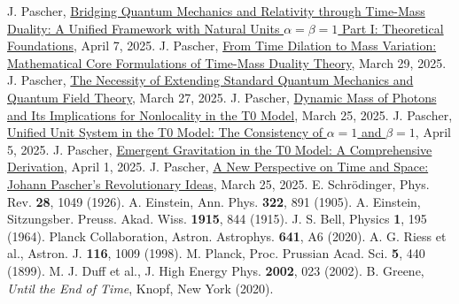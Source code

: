 \documentclass[12pt,a4paper]{article}
\begin{document}
	
	\begin{thebibliography}{99}
		 J. Pascher, \href{https://github.com/jpascher/T0-Time-Mass-Duality/tree/main/2/pdf/English/QMRelTimeMassPart1En.pdf}{Bridging Quantum Mechanics and Relativity through Time-Mass Duality: A Unified Framework with Natural Units \(\alpha = \beta = 1\) Part I: Theoretical Foundations}, April 7, 2025.
		 J. Pascher, \href{https://github.com/jpascher/T0-Time-Mass-Duality/tree/main/2/pdf/English/MathZeitMasseLagrange.pdf}{From Time Dilation to Mass Variation: Mathematical Core Formulations of Time-Mass Duality Theory}, March 29, 2025.
		 J. Pascher, \href{https://github.com/jpascher/T0-Time-Mass-Duality/tree/main/2/pdf/English/NotwendigkeitQMErweiterungEn.pdf}{The Necessity of Extending Standard Quantum Mechanics and Quantum Field Theory}, March 27, 2025.
		 J. Pascher, \href{https://github.com/jpascher/T0-Time-Mass-Duality/tree/main/2/pdf/English/DynMassePhotonenNichtlokalEn.pdf}{Dynamic Mass of Photons and Its Implications for Nonlocality in the T0 Model}, March 25, 2025.
		 J. Pascher, \href{https://github.com/jpascher/T0-Time-Mass-Duality/tree/main/2/pdf/English/Alpha1Beta1KonsistenzEn.pdf}{Unified Unit System in the T0 Model: The Consistency of \(\alpha = 1\) and \(\beta = 1\)}, April 5, 2025.
		 J. Pascher, \href{https://github.com/jpascher/T0-Time-Mass-Duality/tree/main/2/pdf/English/EmergentGravT0En.pdf}{Emergent Gravitation in the T0 Model: A Comprehensive Derivation}, April 1, 2025.
		 J. Pascher, \href{https://github.com/jpascher/T0-Time-Mass-Duality/tree/main/2/pdf/English/ZeitRaumPascherEn.pdf}{A New Perspective on Time and Space: Johann Pascher’s Revolutionary Ideas}, March 25, 2025.
		 E. Schrödinger, Phys. Rev. \textbf{28}, 1049 (1926).
		 A. Einstein, Ann. Phys. \textbf{322}, 891 (1905).
		 A. Einstein, Sitzungsber. Preuss. Akad. Wiss. \textbf{1915}, 844 (1915).
		 J. S. Bell, Physics \textbf{1}, 195 (1964).
		 Planck Collaboration, Astron. Astrophys. \textbf{641}, A6 (2020).
		 A. G. Riess et al., Astron. J. \textbf{116}, 1009 (1998).
		 M. Planck, Proc. Prussian Acad. Sci. \textbf{5}, 440 (1899).
		 M. J. Duff et al., J. High Energy Phys. \textbf{2002}, 023 (2002).
		 B. Greene, \textit{Until the End of Time}, Knopf, New York (2020).

\end{thebibliography}
\end{document}
